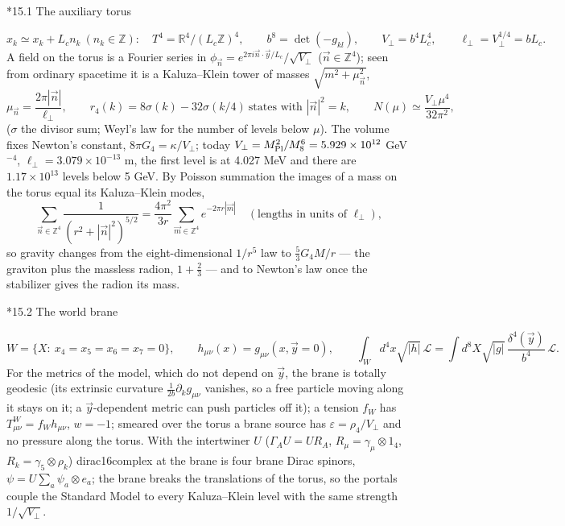 \documentclass[10pt,a4paper]{article}
\makeatletter
\renewcommand\subsection{\@startsection{subsection}{2}{\z@}{-3.25ex\@plus -1ex \@minus -.2ex}{1.5ex \@plus .2ex}{\normalfont\large\bfseries\raggedright}}
\makeatother
\begin{document}
\subsection*{15.1 The auxiliary torus}
\begin{equation*}
x_k\simeq x_k+L_cn_k\ (n_k\in\mathbb Z):\quad T^4=\mathbb R^4/(L_c\mathbb Z)^4,\qquad b^8=\det(-g_{kl}),\qquad V_\perp=b^4L_c^4,\qquad \ell_\perp=V_\perp^{1/4}=bL_c .
\end{equation*}
A field on the torus is a Fourier series in $\phi_{\vec n}=e^{2\pi i\vec n\cdot\vec y/L_c}/\sqrt{V_\perp}$ ($\vec n\in\mathbb Z^4$); seen from ordinary spacetime it is a Kaluza–Klein tower of masses $\sqrt{m^2+\mu_{\vec n}^2}$,
\begin{equation*}
\mu_{\vec n}=\frac{2\pi|\vec n|}{\ell_\perp},\qquad r_4(k)=8\sigma(k)-32\sigma(k/4)\ \text{states with }|\vec n|^2=k,\qquad N(\mu)\simeq\frac{V_\perp\mu^4}{32\pi^2},
\end{equation*}
($\sigma$ the divisor sum; Weyl’s law for the number of levels below $\mu$). The volume fixes Newton’s constant, $8\pi G_4=\kappa/V_\perp$; today $V_\perp=M_{\rm Pl}^2/M_8^6=5.929\times10^{12}$ GeV$^{-4}$, $\ell_\perp=3.079\times10^{-13}$ m, the first level is at 4.027 MeV and there are $1.17\times10^{13}$ levels below 5 GeV. By Poisson summation the images of a mass on the torus equal its Kaluza–Klein modes,
\begin{equation*}
\sum_{\vec n\in\mathbb Z^4}\frac1{(r^2+|\vec n|^2)^{5/2}}=\frac{4\pi^2}{3r}\sum_{\vec m\in\mathbb Z^4}e^{-2\pi r|\vec m|}\quad(\text{lengths in units of }\ell_\perp),
\end{equation*}
so gravity changes from the eight-dimensional $1/r^5$ law to $\frac53G_4M/r$ — the graviton plus the massless radion, $1+\frac23$ — and to Newton’s law once the stabilizer gives the radion its mass.

\subsection*{15.2 The world brane}
\begin{equation*}
W=\{X:\ x_4=x_5=x_6=x_7=0\},\qquad h_{\mu\nu}(x)=g_{\mu\nu}(x,\vec y=0),\qquad \int_Wd^4x\sqrt{|h|}\,\mathcal L=\int d^8X\sqrt{|g|}\,\frac{\delta^4(\vec y)}{b^4}\,\mathcal L .
\end{equation*}
For the metrics of the model, which do not depend on $\vec y$, the brane is totally geodesic (its extrinsic curvature $\frac1{2b}\partial_kg_{\mu\nu}$ vanishes, so a free particle moving along it stays on it; a $\vec y$-dependent metric can push particles off it); a tension $f_W$ has $T^W_{\mu\nu}=f_Wh_{\mu\nu}$, $w=-1$; smeared over the torus a brane source has $\varepsilon=\rho_4/V_\perp$ and no pressure along the torus. With the intertwiner $U$ ($\Gamma_AU=UR_A$, $R_\mu=\gamma_\mu\otimes1_4$, $R_k=\gamma_5\otimes\rho_k$) dirac16complex at the brane is four brane Dirac spinors, $\psi=U\sum_a\psi_a\otimes e_a$; the brane breaks the translations of the torus, so the portals couple the Standard Model to every Kaluza–Klein level with the same strength $1/\sqrt{V_\perp}$.
\end{document}
